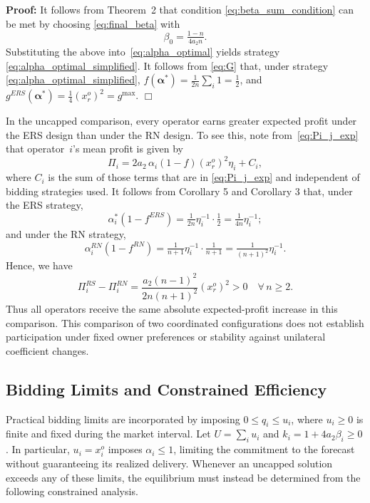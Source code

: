 \documentclass[journal]{IEEEtran}
\begin{document}
\noindent\textbf{Proof:} It follows from  Theorem~2 that condition \eqref{eq:beta_sum_condition} can be met by choosing \eqref{eq:final_beta} with
\begin{equation}
\beta_0= \tfrac{1-n}{4a_2n}.  \label{eq:beta_optimal_simplified}
\end{equation}
Substituting the above into~\eqref{eq:alpha_optimal} yields strategy \eqref{eq:alpha_optimal_simplified}. It follows from \eqref{eq:G} that, under strategy \eqref{eq:alpha_optimal_simplified},
$f(\boldsymbol{\alpha}^*)=\tfrac{1}{2n}\sum_i 1=\tfrac{1}{2}$, and
$g^{ERS}(\boldsymbol{\alpha}^*)=\frac{1}{4}(x_r^o)^2=g^{\max}$. \hfill $\Box$

In the uncapped comparison, every operator earns greater expected profit under the ERS design than under the RN design. To see this, note from~\eqref{eq:Pi_j_exp} that operator~$i$'s mean profit is given by
\[ \Pi_i = 2a_2\,\alpha_i(1-f)(x_r^o)^2\eta_i + C_i, \]
where $C_i$ is the sum of those terms that are in \eqref{eq:Pi_j_exp} and independent of bidding strategies used. It follows from Corollary 5 and Corollary 3 that, under the ERS strategy,
\[ \alpha_i^*(1-f^{ERS}) = \tfrac{1}{2n}\eta_i^{-1}\cdot\tfrac{1}{2} = \tfrac{1}{4n}\eta_i^{-1}; \] 
and under the RN strategy, 
\[ \alpha_i^{RN}(1-f^{RN}) = \tfrac{1}{n+1}\eta_i^{-1}\cdot\tfrac{1}{n+1} = \tfrac{1}{(n+1)^2}\eta_i^{-1}.\] 
Hence, we have
\[
\Pi_i^{RS} - \Pi_i^{RN} = \frac{a_2(n-1)^2}{2n(n+1)^2} (x_r^o)^2 > 0 \quad \forall\, n \geq 2.
\]
Thus all operators receive the same absolute expected-profit increase in this comparison. This comparison of two coordinated configurations does not establish participation under fixed owner preferences or stability against unilateral coefficient changes.

\subsection{Bidding Limits and Constrained Efficiency}
\label{sec:bid_limits}
Practical bidding limits are incorporated by imposing $0\leq q_i\leq u_i$, where $u_i\geq0$ is finite and fixed during the market interval. Let $U=\sum_i u_i$ and $k_i=1+4a_2\beta_i\geq0$. In particular, $u_i=x_i^o$ imposes $\alpha_i\leq1$, limiting the commitment to the forecast without guaranteeing its realized delivery. Whenever an uncapped solution exceeds any of these limits, the equilibrium must instead be determined from the following constrained analysis.
\end{document}
